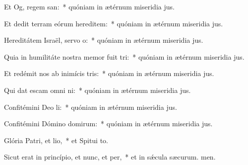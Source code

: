 \item Et Og, regem san:~* quóniam in ætérnum miseridia jus.
\item Et dedit terram eórum hereditem:~* quóniam in ætérnum miseridia jus.
\item Hereditátem Israël, servo o:~* quóniam in ætérnum miseridia jus.
\item Quia in humilitáte nostra memor fuit tri:~* quóniam in ætérnum miseridia jus.
\item Et redémit nos ab inimícis tris:~* quóniam in ætérnum miseridia jus.
\item Qui dat escam omni ni:~* quóniam in ætérnum miseridia jus.
\item Confitémini Deo li:~* quóniam in ætérnum miseridia jus.
\item Confitémini Dómino domirum:~* quóniam in ætérnum miseridia jus.
\item Glória Patri, et lio,~* et Spitui to.
\item Sicut erat in princípio, et nunc, et per,~* et in sǽcula sæcurum. men.
